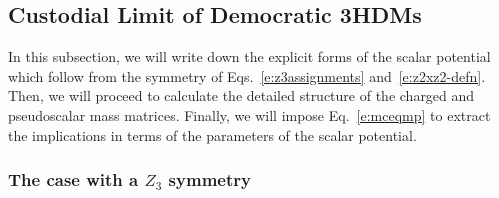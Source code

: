\documentclass[11pt]{article}
\begin{document}
\subsection{Custodial Limit of Democratic 3HDMs}
\label{s:CS_lim_Dem3HDMs}
%
In this subsection, we will write down the explicit forms of the scalar potential which follow from the symmetry of Eqs.~\eqref{e:z3assignments} and~\eqref{e:z2xz2-defn}.  
Then, we will proceed to calculate the detailed structure of the charged and pseudoscalar mass matrices.   
Finally, we will impose Eq.~\eqref{e:mceqmp} to extract the implications in terms of the parameters of the scalar potential.  



\subsubsection{The case with a $Z_3$ symmetry}
\label{ss:Z3}
%
\end{document}
